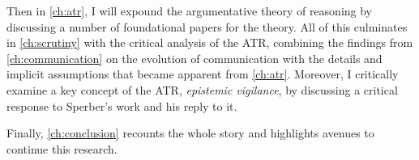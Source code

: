Then in \cref{ch:atr}, I will expound the argumentative theory of reasoning by discussing a number of foundational papers for the theory.
All of this culminates in \cref{ch:scrutiny} with the critical analysis of the ATR, combining the findings from \cref{ch:communication} on the evolution of communication with the details and implicit assumptions that became apparent from \cref{ch:atr}. Moreover, I critically examine a key concept of the ATR, \emph{epistemic vigilance}, by discussing a critical response to Sperber's work and his reply to it.

Finally, \cref{ch:conclusion} recounts the whole story and highlights avenues to continue this research.
